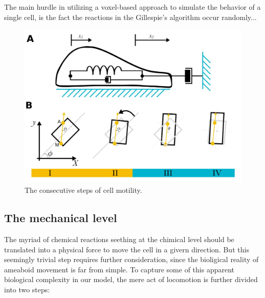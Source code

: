 \documentclass[10pt,letterpaper]{article}
\begin{document}
The main hurdle in utilizing a voxel-based approach to simulate the behavior of a single cell, is the fact the reactions in the Gillespie's algorithm occur randomly...%

\begin{figure}
\includegraphics[scale=0.35]{Fig2.jpeg}
\caption{The consecutive steps of cell motility.}
\label{Fig.2}
\end{figure}

\subsection*{The mechanical level}
The myriad of chemical reactions seething at the chimical level should be translated into a physical force to move the cell in a givern direction. But this seemingly trivial step requires further consideration, since the bioligical reality of ameaboid movement is far from simple. To capture some of this apparent biological complexity in our model, the mere act of locomotion is further divided into two steps:
\end{document}
